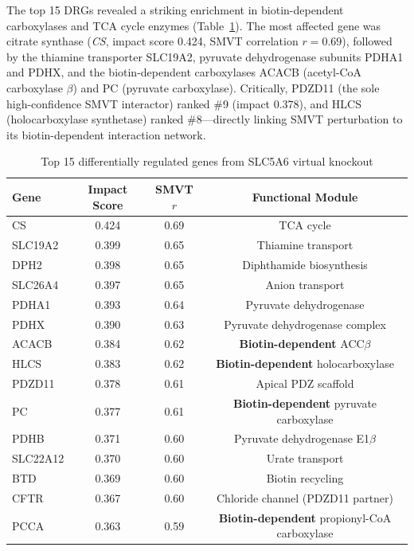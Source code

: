 \documentclass[10pt,letterpaper]{article}
\begin{document}
The top 15 DRGs revealed a striking enrichment in biotin-dependent carboxylases and TCA cycle enzymes (Table~\ref{tab:drg}). The most affected gene was citrate synthase (\textit{CS}, impact score 0.424, SMVT correlation $r=0.69$), followed by the thiamine transporter SLC19A2, pyruvate dehydrogenase subunits PDHA1 and PDHX, and the biotin-dependent carboxylases ACACB (acetyl-CoA carboxylase $\beta$) and PC (pyruvate carboxylase). Critically, PDZD11 (the sole high-confidence SMVT interactor) ranked \#9 (impact 0.378), and HLCS (holocarboxylase synthetase) ranked \#8---directly linking SMVT perturbation to its biotin-dependent interaction network.

\begin{table}[t]
\centering
\caption{Top 15 differentially regulated genes from SLC5A6 virtual knockout}
\label{tab:drg}
\begin{tabular}{lccc}
\toprule
Gene & Impact Score & SMVT $r$ & Functional Module \\
\midrule
CS       & 0.424 & 0.69 & TCA cycle \\
SLC19A2  & 0.399 & 0.65 & Thiamine transport \\
DPH2     & 0.398 & 0.65 & Diphthamide biosynthesis \\
SLC26A4  & 0.397 & 0.65 & Anion transport \\
PDHA1    & 0.393 & 0.64 & Pyruvate dehydrogenase \\
PDHX     & 0.390 & 0.63 & Pyruvate dehydrogenase complex \\
ACACB    & 0.384 & 0.62 & \textbf{Biotin-dependent} ACC$\beta$ \\
HLCS     & 0.383 & 0.62 & \textbf{Biotin-dependent} holocarboxylase \\
PDZD11   & 0.378 & 0.61 & Apical PDZ scaffold \\
PC       & 0.377 & 0.61 & \textbf{Biotin-dependent} pyruvate carboxylase \\
PDHB     & 0.371 & 0.60 & Pyruvate dehydrogenase E1$\beta$ \\
SLC22A12 & 0.370 & 0.60 & Urate transport \\
BTD      & 0.369 & 0.60 & Biotin recycling \\
CFTR     & 0.367 & 0.60 & Chloride channel (PDZD11 partner) \\
PCCA     & 0.363 & 0.59 & \textbf{Biotin-dependent} propionyl-CoA carboxylase \\
\bottomrule
\end{tabular}
\end{table}
\end{document}
